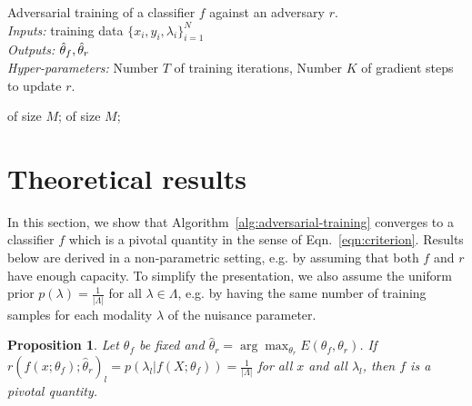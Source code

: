 \documentclass{article}
\theoremstyle{plain}
\newtheorem{proposition}[theorem]{Proposition}
\begin{document}
\begin{algorithm}[t]
\caption{Adversarial training of a classifier $f$ against an adversary $r$.\\
{\it Inputs:} training data $\{ x_i, y_i, \lambda_i \}_{i=1}^N$\\
{\it Outputs:} $\smash{\hat\theta_f}, \smash{\hat\theta_r}$\\
{\it Hyper-parameters:} Number $T$ of training iterations, Number $K$ of gradient steps to update $r$.}
\label{alg:adversarial-training}
\begin{algorithmic}[1]
         
             of size $M$;
        \EndFor
         of size $M$; 
    \EndFor
\end{algorithmic}
\end{algorithm}


\section{Theoretical results}

In this section, we show that Algorithm~\ref{alg:adversarial-training} converges
to a classifier $f$ which is a pivotal quantity in the sense of Eqn.~\ref{eqn:criterion}.
Results below are derived in a non-parametric setting, e.g. by assuming
that both $f$ and $r$ have enough capacity. To simplify the presentation,
we also assume the uniform prior
$p(\lambda) = \frac{1}{|\Lambda|}$ for all $\lambda \in \Lambda$, e.g. by
having the same number of training samples for each modality $\lambda$ of
the nuisance parameter.


\begin{proposition}

Let $\theta_f$ be fixed and $\hat\theta_r = \arg \max_{\theta_r} E(\theta_f,
\theta_r)$. If $r(f(x;\theta_f) ; \hat\theta_r )_l = p(\lambda_l| f(X; \theta_f)) = \frac{1}{|\Lambda|}$ for all
$x$ and all $\lambda_l$, then $f$ is a pivotal quantity.

\end{proposition}
\end{document}
